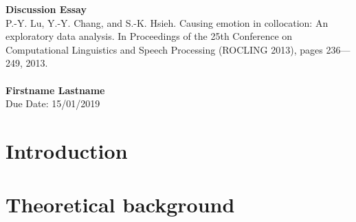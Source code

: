 \documentclass[a4paper, 12pt]{article}
\begin{document}
\noindent
\large\textbf{Discussion Essay} \\  
\normalsize P.-Y. Lu, Y.-Y. Chang, and S.-K. Hsieh.  Causing emotion in collocation:  An exploratory data analysis. In Proceedings of the 25th Conference on Computational Linguistics and Speech Processing (ROCLING 2013), pages 236---249, 2013.
\\ \\
\textbf{Firstname Lastname} \\
\normalsize   Due Date: 15/01/2019


\section*{Introduction}
\lipsum[1]

\section*{Theoretical background}
\lipsum[2]
\cite{lu2013causing}








\end{document}
